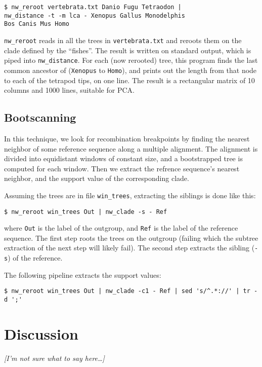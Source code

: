 \documentclass{bioinfo}
\newcommand{\prog}[1]{\texttt{nw\_#1}}
\begin{document}
\begin{verbatim}
$ nw_reroot vertebrata.txt Danio Fugu Tetraodon | 
nw_distance -t -m lca - Xenopus Gallus Monodelphis
Bos Canis Mus Homo 
\end{verbatim}

\prog{reroot} reads in all the trees in \texttt{vertebrata.txt} and reroots
them on the clade defined by the ``fishes''. The result is written on standard
output, which is piped into \prog{distance}. For each (now rerooted) tree,
this program finds the last common ancestor of (\texttt{Xenopus} to
\texttt{Homo}), and prints out the length from that node to each of the
tetrapod tips, on one line. The result is a rectangular matrix of 10 columns
and 1000 lines, suitable for \textsc{PCA}.

\subsection*{Bootscanning}

In this technique, we look for recombination breakpoints by finding the nearest neighbor of some reference sequence along a multiple alignment. The alignment is divided into equidistant windows of constant size, and a bootstrapped tree is computed for each window. Then we extract the refrence sequence's nearest neighbor, and the support value of the corresponding clade.

Assuming the trees are in file \verb|win_trees|, extracting the siblings is done like this:
\begin{verbatim}
$ nw_reroot win_trees Out | nw_clade -s - Ref 
\end{verbatim}
where \texttt{Out} is the label of the outgroup, and \texttt{Ref} is the label of the reference sequence. The first step roots the trees on the outgroup (failing which the subtree extraction of the next step will likely fail). The second step extracts the sibling (\texttt{-s}) of the reference. 

The following pipeline extracts the support values:
\begin{verbatim}
$ nw_reroot win_trees Out | nw_clade -c1 - Ref | sed 's/^.*://' | tr -d ';'
\end{verbatim}

\section{Discussion}

\emph{[I'm not sure what to say here\ldots]}
\end{document}
